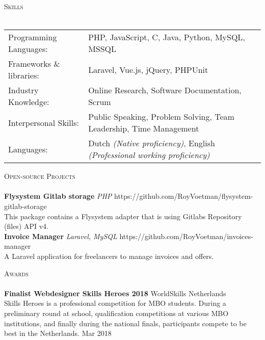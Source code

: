 \documentclass[a4paper]{article}
\newcommand{\lineunder} {
    \vspace*{-8pt} \\
    \hspace*{-18pt} \hrulefill \\
}
\newcommand{\header} [1] {
    {\hspace*{-18pt}\vspace*{6pt} \textsc{#1}}
    \vspace*{-6pt} \lineunder
}
\begin{document}
\header{Skills}
\begin{tabular}{ l l }
	Programming Languages:   & PHP, JavaScript, C, Java, Python, MySQL, MSSQL                     \\
    Frameworks \& libraries: & Laravel, Vue.js, jQuery, PHPUnit                                   \\
	Industry Knowledge:      & Online Research, Software Documentation, Scrum                     \\
	Interpersonal Skills:    & Public Speaking, Problem Solving, Team Leadership, Time Management \\
    Languages:               & Dutch \emph{(Native proficiency)}, English \emph{(Professional working proficiency)}\\
\end{tabular}
\vspace{2mm}

\newpage

\header{Open-source Projects}
{\textbf{Flysystem Gitlab storage}} {\sl PHP} \hfill https://github.com/RoyVoetman/flysystem-gitlab-storage\\
This package contains a Flysystem adapter that is using Gitlab\textquotesingle{}s Repository (files) API v4.\\
\vspace*{2mm}
{\textbf{Invoice Manager}} {\sl Laravel, MySQL} \hfill https://github.com/RoyVoetman/invoices-manager\\
A Laravel application for freelancers to manage invoices and offers.\\
\vspace*{2mm}

\header{Awards}
\textbf{Finalist Webdesigner Skills Heroes 2018} \hfill WorldSkills Netherlands\\
Skills Heroes is a professional competition for MBO students. During a preliminary round at school, qualification competitions at various MBO institutions, and finally during the national finals, participants compete to be best in the Netherlands. \hfill Mar 2018\\
\vspace*{2mm}

\ 
\end{document}
